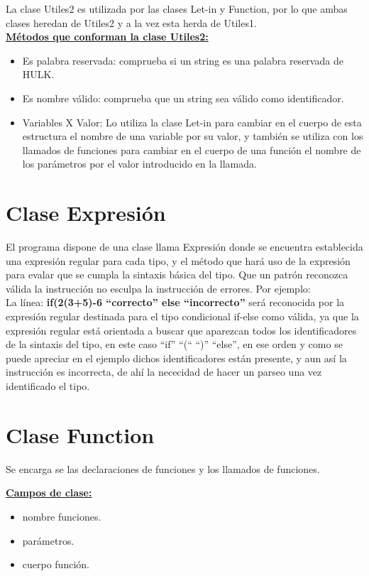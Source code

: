 \documentclass[12pt, letterpaper]{article}
\begin{document}
La clase Utiles2 es utilizada por las clases Let-in y Function, por lo que ambas clases heredan de Utiles2 y a la vez esta herda de Utiles1. \\ 

\textbf{\underline{Métodos que conforman la clase Utiles2:}} 

\begin{itemize}
    \item Es palabra reservada: comprueba si un string es una palabra reservada de HULK.
    \item Es nombre válido: comprueba que un string sea válido como identificador.
    \item Variables X Valor: Lo utiliza la clase Let-in para cambiar en el cuerpo de esta estructura el nombre de una variable por su valor, y también se utiliza con los llamados de funciones para cambiar en el cuerpo de una función el nombre de los parámetros por el valor introducido en la llamada.
\end{itemize}
\newpage

\section{Clase Expresión}
El programa dispone de una clase llama Expresión donde se encuentra establecida una expresión regular para cada tipo, y el método que hará 
uso de la expresión para evalar que se cumpla la sintaxis básica del tipo. Que un patrón reconozca válida la instrucción no esculpa la 
instrucción de errores. Por ejemplo: \\
La línea: \textbf{ if(2\<(3+5)-6 “correcto” else “incorrecto”} será reconocida por la expresión regular destinada para el tipo condicional 
if-else como válida, ya que la expresión regular está orientada a buscar que aparezcan todos los identificadores de la sintaxis del tipo, 
en este caso “if” “(“ “)” “else”, en ese orden y como se puede apreciar en el ejemplo dichos identificadores están presente, y aun así la 
instrucción es incorrecta, de ahí la nececidad de hacer un parseo una vez identificado el tipo.
\newpage

\section{Clase Function}
Se encarga se las declaraciones de funciones y los llamados de funciones.

\textbf{\underline{Campos de clase: }} 
\begin{itemize}
    \item nombre funciones. 
    \item parámetros.
    \item cuerpo función.
\end{itemize}
\end{document}
